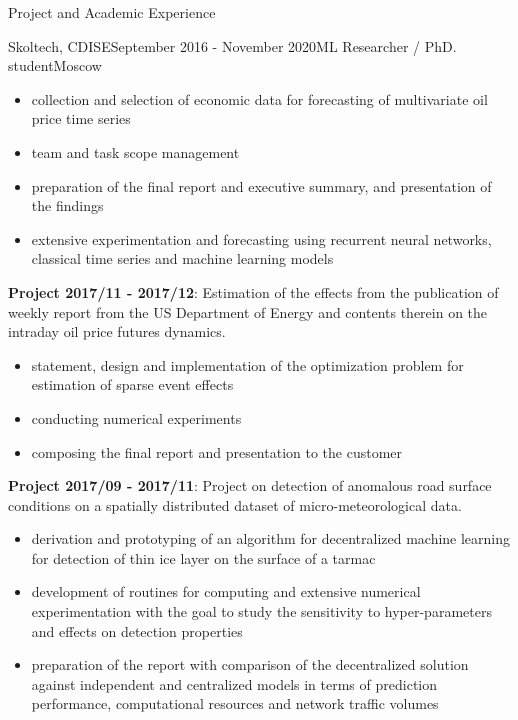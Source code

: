 \documentclass{resume} %
\begin{document}
\begin{rSection}{Project and Academic Experience}
\begin{rSubsection}{Skoltech, CDISE}{September 2016 - November 2020}{ML Researcher / PhD. student}{Moscow}
\begin{itemize}
        \item collection and selection of economic data for forecasting of multivariate oil
        price time series
        
        \item team and task scope management
        
        \item preparation of the final report and executive summary, and presentation
        of the findings
        
        \item extensive experimentation and forecasting using recurrent neural networks, classical
        time series and machine learning models
    \end{itemize}

    \medskip
    \item \textbf{Project 2017/11 - 2017/12}:
    Estimation of the effects from the publication of weekly report from the US Department
    of Energy and contents therein on the intraday oil price futures dynamics.
    \begin{itemize}
        \item statement, design and implementation of the optimization problem for
        estimation of sparse event effects
        
        \item conducting numerical experiments
        
        \item composing the final report and presentation to the customer
    \end{itemize}

    \medskip
    \item \textbf{Project 2017/09 - 2017/11}:
    Project on detection of anomalous road surface conditions on a spatially distributed
    dataset of micro-meteorological data. \begin{itemize}
        \item derivation and prototyping of an algorithm for decentralized machine
        learning for detection of thin ice layer on the surface of a tarmac
        
        \item development of routines for computing and extensive numerical experimentation
        with the goal to study the sensitivity to hyper-parameters and effects on detection
        properties
        
        \item preparation of the report with comparison of the decentralized solution
        against independent and centralized models in terms of prediction performance,
        computational resources and network traffic volumes
    \end{itemize}


\end{rSubsection}
\end{rSection}
\end{document}
